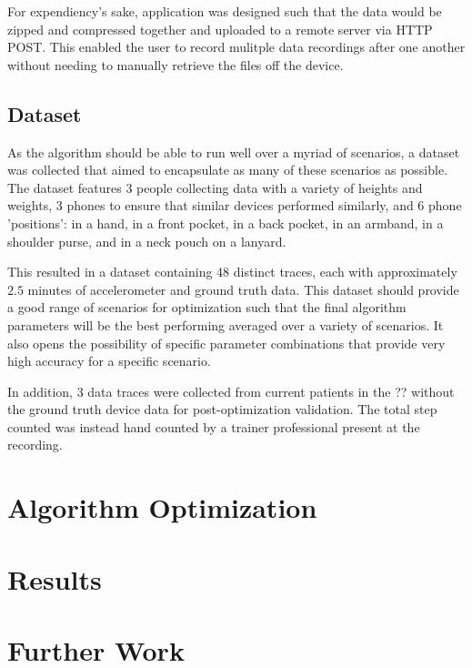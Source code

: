             For expendiency's sake, application was designed such that the data would be zipped and compressed together and uploaded to a remote server via HTTP POST. This enabled the user to record mulitple data recordings after one another without needing to manually retrieve the files off the device.


        \section{Dataset}

            As the algorithm should be able to run well over a myriad of scenarios, a dataset was collected that aimed to encapsulate as many of these scenarios as possible. The dataset features 3 people collecting data with a variety of heights and weights, 3 phones to ensure that similar devices performed similarly, and 6 phone 'positions': in a hand, in a front pocket, in a back pocket, in an armband, in a shoulder purse, and in a neck pouch on a lanyard. 

            This resulted in a dataset containing 48 distinct traces, each with approximately $2.5$ minutes of accelerometer and ground truth data. This dataset should provide a good range of scenarios for optimization such that the final algorithm parameters will be the best performing averaged over a variety of scenarios. It also opens the possibility of specific parameter combinations that provide very high accuracy for a specific scenario. 

            In addition, 3 data traces were collected from current patients in the ?? without the ground truth device data for post-optimization validation. The total step counted was instead hand counted by a trainer professional present at the recording.

    \chapter{Algorithm Optimization}

    \chapter{Results}

    \chapter{Further Work}